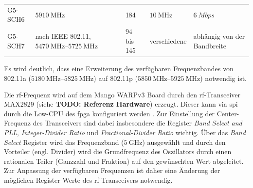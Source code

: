\documentclass[ngerman,]{scrartcl}
\begin{document}
\begin{longtable}[]{@{}lllll@{}}
\begin{minipage}[t]{0.08\columnwidth}
G5-SCH6\strut
\end{minipage} & \begin{minipage}[t]{0.30\columnwidth}\raggedright\strut
\(\SI{5910}{\mega\hertz}\)\strut
\end{minipage} & \begin{minipage}[t]{0.16\columnwidth}\raggedright\strut
184\strut
\end{minipage} & \begin{minipage}[t]{0.14\columnwidth}\raggedright\strut
\(\SI{10}{\mega\hertz}\)\strut
\end{minipage} & \begin{minipage}[t]{0.18\columnwidth}\raggedright\strut
\(\SI{6}{Mbps}\)\strut
\end{minipage}\tabularnewline
\begin{minipage}[t]{0.08\columnwidth}\raggedright\strut
G5-SCH7\strut
\end{minipage} & \begin{minipage}[t]{0.30\columnwidth}\raggedright\strut
nach IEEE 802.11, \(\SIrange{5470}{5725}{\mega\hertz}\)\strut
\end{minipage} & \begin{minipage}[t]{0.16\columnwidth}\raggedright\strut
94 bis 145\strut
\end{minipage} & \begin{minipage}[t]{0.14\columnwidth}\raggedright\strut
verschiedene\strut
\end{minipage} & \begin{minipage}[t]{0.18\columnwidth}\raggedright\strut
abhängig von der Bandbreite\strut
\end{minipage}\tabularnewline
\bottomrule
\end{longtable}

Es wird deutlich, dass eine Erweiterung des verfügbaren Frequenzbandes
von 802.11a (\(\SIrange{5180}{5825}{\mega\hertz}\)) auf 802.11p
(\(\SIrange{5850}{5925}{\mega\hertz}\)) notwendig ist.

Die \ac{rf}-Frequenz wird auf dem Mango WARPv3 Board durch den
\ac{rf}-Transceiver MAX2829 (siehe \textbf{TODO: Referenz Hardware})
erzeugt. Dieser kann via \ac{spi} durch die Low-CPU des \ac{fpga}
konfiguriert werden \autocite{max2829}. Zur Einstellung der
Center-Frequenz des Transceivers sind dabei insbesondere die Register
\emph{Band Select and PLL}, \emph{Integer-Divider Ratio} und
\emph{Fractional-Divider Ratio} wichtig. Über das \emph{Band Select}
Register wird das Frequenzband (\(\SI{5}{\giga\hertz}\)) ausgewählt und
durch den Vorteiler (engl. Divider) wird die Grundfrequenz des
Oszillators durch einen rationalen Teiler (Ganzzahl und Fraktion) auf
den gewünschten Wert abgeleitet. Zur Anpassung der verfügbaren
Frequenzen ist daher eine Änderung der möglichen Register-Werte des
\ac{rf}-Transceivers notwendig.
\end{document}
